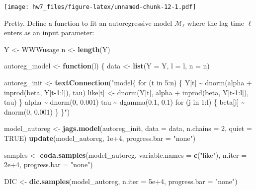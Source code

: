 \documentclass[
]{article}
\newenvironment{Shaded}{\begin{snugshade}}{\end{snugshade}}
\newcommand{\AttributeTok}[1]{\textcolor[rgb]{0.13,0.29,0.53}{#1}}
\newcommand{\ConstantTok}[1]{\textcolor[rgb]{0.56,0.35,0.01}{#1}}
\newcommand{\ControlFlowTok}[1]{\textcolor[rgb]{0.13,0.29,0.53}{\textbf{#1}}}
\newcommand{\DecValTok}[1]{\textcolor[rgb]{0.00,0.00,0.81}{#1}}
\newcommand{\FloatTok}[1]{\textcolor[rgb]{0.00,0.00,0.81}{#1}}
\newcommand{\FunctionTok}[1]{\textcolor[rgb]{0.13,0.29,0.53}{\textbf{#1}}}
\newcommand{\NormalTok}[1]{#1}
\newcommand{\OtherTok}[1]{\textcolor[rgb]{0.56,0.35,0.01}{#1}}
\newcommand{\StringTok}[1]{\textcolor[rgb]{0.31,0.60,0.02}{#1}}
\begin{document}
\texttt{[image: hw7\_files/figure-latex/unnamed-chunk-12-1.pdf]}

Pretty. Define a function to fit an autoregressive model
\(\mathcal M_\ell\) where the lag time \(\ell\) enters as an input
parameter:

\begin{Shaded}
\begin{Highlighting}[]
\NormalTok{Y }\OtherTok{\textless{}{-}}\NormalTok{ WWWusage}
\NormalTok{n }\OtherTok{\textless{}{-}} \FunctionTok{length}\NormalTok{(Y)}

\NormalTok{autoreg\_model }\OtherTok{\textless{}{-}} \ControlFlowTok{function}\NormalTok{(l) \{}
\NormalTok{  data }\OtherTok{\textless{}{-}} \FunctionTok{list}\NormalTok{(}\AttributeTok{Y =}\NormalTok{ Y, }\AttributeTok{l =}\NormalTok{ l, }\AttributeTok{n =}\NormalTok{ n)}
  
\NormalTok{  autoreg\_init }\OtherTok{\textless{}{-}} \FunctionTok{textConnection}\NormalTok{(}\StringTok{"model\{}
\StringTok{    for (t in 5:n) \{}
\StringTok{      Y[t]     \textasciitilde{} dnorm(alpha + inprod(beta, Y[t{-}1:l]), tau)}
\StringTok{      like[t] \textless{}{-} dnorm(Y[t], alpha + inprod(beta, Y[t{-}1:l]), tau)}
\StringTok{    \}}
\StringTok{    }
\StringTok{    alpha \textasciitilde{} dnorm(0, 0.001)}
\StringTok{    tau   \textasciitilde{} dgamma(0.1, 0.1)}
\StringTok{    for (j in 1:l) \{ beta[j] \textasciitilde{} dnorm(0, 0.001) \}}
\StringTok{    }
\StringTok{  \}"}\NormalTok{)}
  
\NormalTok{  model\_autoreg }\OtherTok{\textless{}{-}} \FunctionTok{jags.model}\NormalTok{(autoreg\_init, }\AttributeTok{data =}\NormalTok{ data, }\AttributeTok{n.chains =} \DecValTok{2}\NormalTok{, }\AttributeTok{quiet =} \ConstantTok{TRUE}\NormalTok{)}
  \FunctionTok{update}\NormalTok{(model\_autoreg, }\FloatTok{1e+4}\NormalTok{, }\AttributeTok{progress.bar =} \StringTok{"none"}\NormalTok{)}
  
\NormalTok{  samples }\OtherTok{\textless{}{-}} \FunctionTok{coda.samples}\NormalTok{(model\_autoreg, }\AttributeTok{variable.names =} \FunctionTok{c}\NormalTok{(}\StringTok{"like"}\NormalTok{), }\AttributeTok{n.iter =} \FloatTok{2e+4}\NormalTok{,}
                          \AttributeTok{progress.bar =} \StringTok{"none"}\NormalTok{)}

\NormalTok{  DIC }\OtherTok{\textless{}{-}} \FunctionTok{dic.samples}\NormalTok{(model\_autoreg, }\AttributeTok{n.iter =} \FloatTok{5e+4}\NormalTok{, }\AttributeTok{progress.bar =} \StringTok{"none"}\NormalTok{)}
  

\end{Highlighting}
\end{Shaded}
\end{document}
